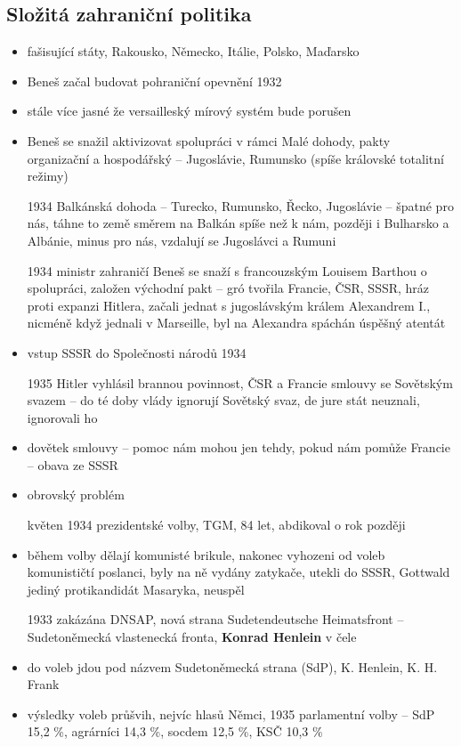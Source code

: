 \documentclass{article}
\begin{document}
\subsection*{Složitá zahraniční politika}
\begin{itemize}
    \item fašisující státy, Rakousko, Německo, Itálie, Polsko, Maďarsko
    \item Beneš začal budovat pohraniční opevnění 1932
    \item stále více jasné že versailleský mírový systém bude porušen
    \item Beneš se snažil aktivizovat spolupráci v rámci Malé dohody, pakty organizační a hospodářský -- Jugoslávie, Rumunsko (spíše královské totalitní režimy)
    \item[1934] Balkánská dohoda --  Turecko, Rumunsko, Řecko, Jugoslávie -- špatné pro nás, táhne to země směrem na Balkán spíše než k nám, později i Bulharsko a Albánie, minus pro nás, vzdalují se Jugoslávci a Rumuni
    \item[1934] ministr zahraničí Beneš se snaží s francouzským Louisem Barthou o spolupráci, založen východní pakt -- gró tvořila Francie, ČSR, SSSR, hráz proti expanzi Hitlera, začali jednat s jugoslávským králem Alexandrem I., nicméně když jednali v Marseille, byl na Alexandra spáchán úspěšný atentát
    \item vstup SSSR do Společnosti národů 1934
    \item[1935] Hitler vyhlásil brannou povinnost, ČSR a Francie smlouvy se Sovětským svazem -- do té doby vlády ignorují Sovětský svaz, de jure stát neuznali, ignorovali ho
    \item dovětek smlouvy -- pomoc nám mohou jen tehdy, pokud nám pomůže Francie -- obava ze SSSR
    \item obrovský problém
    \item[květen 1934] prezidentské volby, TGM, 84 let, abdikoval o rok později
    \item během volby dělají komunisté brikule, nakonec vyhozeni od voleb komunističtí poslanci, byly na ně vydány zatykače, utekli do SSSR, Gottwald jediný protikandidát Masaryka, neuspěl
    \item[1933] zakázána DNSAP, nová strana Sudetendeutsche Heimatsfront -- Sudetoněmecká vlastenecká fronta, \textbf{Konrad Henlein} v čele
    \item do voleb jdou pod názvem Sudetoněmecká strana (SdP), K. Henlein, K. H. Frank
    \item výsledky voleb průšvih, nejvíc hlasů Němci, 1935 parlamentní volby -- SdP 15,2 \%, agrárníci 14,3 \%, socdem 12,5 \%, KSČ 10,3 \%

\end{itemize}
\end{document}
